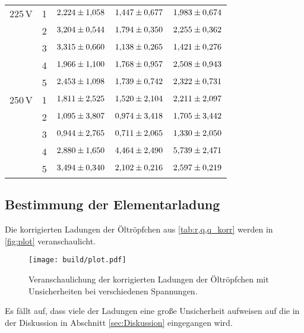 \begin{table}[H]
\begin{tabular}{S S S S S}
        {225\,V}    & 1 &   $\num{2.224+-1.058}$ & $\num{1.447+-0.677}$ & $\num{1.983+-0.674}$\\
        {}          & 2 &   $\num{3.204+-0.544}$ & $\num{1.794+-0.350}$ & $\num{2.255+-0.362}$\\
        {}          & 3 &   $\num{3.315+-0.660}$ & $\num{1.138+-0.265}$ & $\num{1.421+-0.276}$\\
        {}          & 4 &   $\num{1.966+-1.100}$ & $\num{1.768+-0.957}$ & $\num{2.508+-0.943}$\\
        {}          & 5 &   $\num{2.453+-1.098}$ & $\num{1.739+-0.742}$ & $\num{2.322+-0.731}$\\
        {250\,V}    & 1 &   $\num{1.811+-2.525}$ & $\num{1.520+-2.104}$ & $\num{2.211+-2.097}$\\
        {}          & 2 &   $\num{1.095+-3.807}$ & $\num{0.974+-3.418}$ & $\num{1.705+-3.442}$\\
        {}          & 3 &   $\num{0.944+-2.765}$ & $\num{0.711+-2.065}$ & $\num{1.330+-2.050}$\\
        {}          & 4 &   $\num{2.880+-1.650}$ & $\num{4.464+-2.490}$ & $\num{5.739+-2.471}$\\
        {}          & 5 &   $\num{3.494+-0.340}$ & $\num{2.102+-0.216}$ & $\num{2.597+-0.219}$\\ 
        \bottomrule
    \end{tabular}
  \end{table}

\subsection{Bestimmung der Elementarladung}
Die korrigierten Ladungen der Öltröpfchen aus \autoref{tab:r,q,q_korr} werden in \autoref{fig:plot} veranschaulicht.
  \begin{figure}[H]
    \centering
    \texttt{[image: build/plot.pdf]}
    \caption{Veranschaulichung der korrigierten Ladungen der Öltröpfchen mit Unsicherheiten bei verschiedenen Spannungen.}
    \label{fig:plot}
\end{figure}
Es fällt auf, dass viele der Ladungen eine große Unsicherheit aufweisen auf die in der Diskussion in Abschnitt \ref{sec:Diskussion} 
eingegangen wird.

